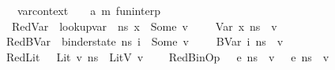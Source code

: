 \begin{isabellebody}
\ \ \ {\isasymLambda}\ {\isacharcolon}{\kern0pt}{\isacharcolon}{\kern0pt}\ {\isachardoublequoteopen}var{\isacharunderscore}{\kern0pt}context{\isachardoublequoteclose}\ \ {\isasymGamma}\ {\isacharcolon}{\kern0pt}{\isacharcolon}{\kern0pt}\ {\isachardoublequoteopen}{\isacharparenleft}{\kern0pt}{\isacharprime}{\kern0pt}a{\isacharcomma}{\kern0pt}\ {\isacharprime}{\kern0pt}m{\isacharparenright}{\kern0pt}\ fun{\isacharunderscore}{\kern0pt}interp{\isachardoublequoteclose}\isanewline
\ \ \ \isanewline
\ \ \ \ RedVar{\isacharcolon}{\kern0pt}\ {\isachardoublequoteopen}{\isasymlbrakk}\ lookup{\isacharunderscore}{\kern0pt}var\ {\isasymLambda}\ n{\isacharunderscore}{\kern0pt}s\ x\ {\isacharequal}{\kern0pt}\ Some\ v\ {\isasymrbrakk}\ {\isasymLongrightarrow}\ {\isasymLambda}{\isacharcomma}{\kern0pt}{\isasymGamma}{\isacharcomma}{\kern0pt}{\isasymOmega}\ {\isasymturnstile}\ {\isasymlangle}{\isacharparenleft}{\kern0pt}Var\ x{\isacharparenright}{\kern0pt}{\isacharcomma}{\kern0pt}\ n{\isacharunderscore}{\kern0pt}s{\isasymrangle}\ {\isasymDown}\ v{\isachardoublequoteclose}\isanewline
\ \ {\isacharbar}{\kern0pt}\ RedBVar{\isacharcolon}{\kern0pt}\ {\isachardoublequoteopen}{\isasymlbrakk}\ binder{\isacharunderscore}{\kern0pt}state\ n{\isacharunderscore}{\kern0pt}s\ i\ {\isacharequal}{\kern0pt}\ Some\ v\ {\isasymrbrakk}\ {\isasymLongrightarrow}\ {\isasymLambda}{\isacharcomma}{\kern0pt}{\isasymGamma}{\isacharcomma}{\kern0pt}{\isasymOmega}\ {\isasymturnstile}\ {\isasymlangle}BVar\ i{\isacharcomma}{\kern0pt}\ n{\isacharunderscore}{\kern0pt}s{\isasymrangle}\ {\isasymDown}\ v{\isachardoublequoteclose}\isanewline
\ \ {\isacharbar}{\kern0pt}\ RedLit{\isacharcolon}{\kern0pt}\ {\isachardoublequoteopen}{\isasymLambda}{\isacharcomma}{\kern0pt}{\isasymGamma}{\isacharcomma}{\kern0pt}{\isasymOmega}\ {\isasymturnstile}\ {\isasymlangle}{\isacharparenleft}{\kern0pt}Lit\ v{\isacharparenright}{\kern0pt}{\isacharcomma}{\kern0pt}\ n{\isacharunderscore}{\kern0pt}s{\isasymrangle}\ {\isasymDown}\ LitV\ v{\isachardoublequoteclose}\ \isanewline
\ \ {\isacharbar}{\kern0pt}\ RedBinOp{\isacharcolon}{\kern0pt}\ {\isachardoublequoteopen}{\isasymlbrakk}{\isasymLambda}{\isacharcomma}{\kern0pt}{\isasymGamma}{\isacharcomma}{\kern0pt}{\isasymOmega}\ {\isasymturnstile}\ {\isasymlangle}e{}{\isacharcomma}{\kern0pt}\ n{\isacharunderscore}{\kern0pt}s{\isasymrangle}\ {\isasymDown}\ v{}{\isacharsemicolon}{\kern0pt}\ {\isasymLambda}{\isacharcomma}{\kern0pt}{\isasymGamma}{\isacharcomma}{\kern0pt}{\isasymOmega}\ {\isasymturnstile}\ {\isasymlangle}e{}{\isacharcomma}{\kern0pt}\ n{\isacharunderscore}{\kern0pt}s{\isasymrangle}\ {\isasymDown}\ v{}{\isacharsemicolon}{\kern0pt}\isanewline

\end{isabellebody}
